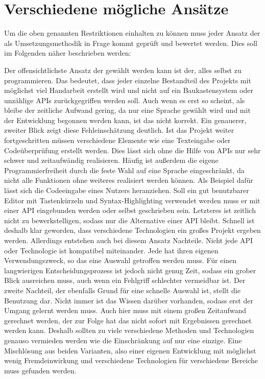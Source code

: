 \section{Verschiedene mögliche Ansätze}

Um die oben genannten Restriktionen einhalten zu können muss jeder Ansatz der als Umsetzungsmethodik in Frage kommt geprüft und bewertet werden. Dies soll im Folgenden näher beschrieben werden:

Der offensichtlichste Ansatz der gewählt werden kann ist der, alles selbst zu programmieren. Das bedeutet, dass jeder einzelne Bestandteil des Projekts mit möglichst viel Handarbeit erstellt wird und nicht auf ein Baukastensystem oder unzählige APIs zurückgegriffen werden soll. Auch wenn es erst so scheint, als bleibe der zeitliche Aufwand gering, da nur eine Sprache gewählt wird und mit der Entwicklung begonnen werden kann, ist das nicht korrekt. Ein genauerer, zweiter Blick zeigt diese Fehleinschätzung deutlich. Ist das Projekt weiter fortgeschritten müssen verschiedene Elemente wie eine Texteingabe oder Codeüberprüfung erstellt werden. Dies lässt sich ohne die Hilfe von APIs nur sehr schwer und zeitaufwändig realisieren. Häufig ist außerdem die eigene Programmierfreiheit durch die feste Wahl auf eine Sprache eingeschränkt, da nicht alle Funktionen ohne weiteres realisiert werden können. Als Beispiel dafür lässt sich die Codeeingabe eines Nutzers heranziehen. Soll ein gut benutzbarer Editor mit Tastenkürzeln und Syntax-Highlighting verwendet werden muss er mit einer API eingebunden werden oder selbst geschrieben sein. Letzteres ist zeitlich nicht zu bewerkstelligen, sodass nur die Alternative einer API bleibt. Schnell ist deshalb klar geworden, dass verschiedene Technologien ein großes Projekt ergeben werden. Allerdings entstehen auch bei diesem Ansatz Nachteile. Nicht jede API oder Technologie ist kompatibel miteinander. Jede hat ihren eigenen Verwendungszweck, so das eine Auswahl getroffen werden muss. Für einen langwierigen Entscheidungsprozess ist jedoch nicht genug Zeit, sodass ein grober Blick ausreichen muss, auch wenn ein Fehlgriff schlechter vermeidbar ist. Der zweite Nachteil, der ebenfalls Grund für eine schnelle Auswahl ist, stellt die Benutzung dar. Nicht immer ist das Wissen darüber vorhanden, sodass erst der Umgang gelernt werden muss. Auch hier muss mit einem großen Zeitaufwand gerechnet werden, der zur Folge hat das nicht sofort mit Ergebnissen gerechnet werden kann. Deshalb sollten zu viele verschiedene Methoden und Technologien genauso vermieden werden wie die Einschränkung auf nur eine einzige. Eine Mischlösung aus beiden Varianten, also einer eigenen Entwicklung mit möglichst wenig Fremdeinwirkung und verschiedene Technologien für verschiedene Bereiche muss gefunden werden.

